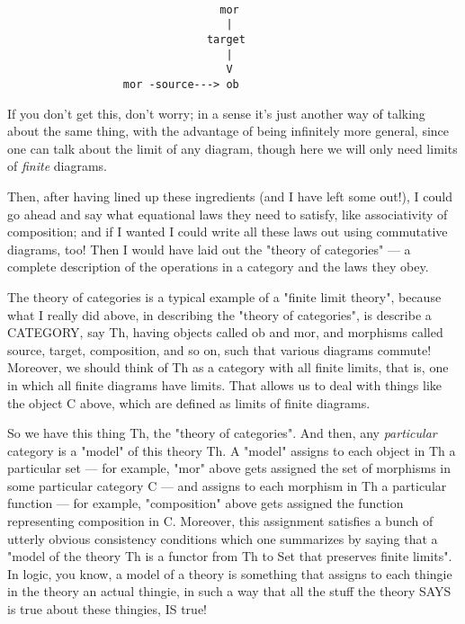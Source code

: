 \begin{verbatim}

                                 mor
                                  |
                               target
                                  |
                                  V
                  mor -source---> ob 
\end{verbatim}
    

If you don't get this, don't worry; in a sense it's just another way 
of talking about the same thing, with the advantage of being 
infinitely more general, since one can talk about the limit of 
any diagram, though here we will only need limits of \emph{finite}
diagrams.

Then, after having lined up these ingredients (and I have left some 
out!), I could go ahead and say what equational laws they need 
to satisfy, like associativity of composition; and if I wanted I 
could write all these laws out using commutative diagrams, too!  
Then I would have laid out the "theory of categories" --- 
a complete description of the operations in a category and the laws they obey.  

The theory of categories is a typical example of a "finite limit 
theory", because what I really did above, in describing
the "theory of categories", is describe a CATEGORY, say Th, having
objects called ob and mor, and morphisms called source, target, composition,
and so on, such that various diagrams commute!   Moreover, we should
think of Th as a category with all finite limits, that is, one in which
all finite diagrams have limits.  That allows us to deal with things
like the object C above, which are defined as limits of finite
diagrams.

So we have this thing Th, the "theory of categories".  And then, 
any \emph{particular} category is a "model" of this theory Th.
A "model" assigns to each object in Th a particular
set --- for example, "mor" above gets assigned
the set of morphisms in some particular category C --- and assigns to each
morphism in Th a particular function --- for example,  
"composition" above gets assigned the function representing composition
in C.  Moreover, this assignment satisfies a bunch of utterly obvious 
consistency conditions which one summarizes by saying that a 
"model of the theory Th is a functor from Th to Set that preserves 
finite limits".  In logic, you know, a model of a theory is something 
that assigns to each thingie in the theory an actual thingie, in such a 
way that all the stuff the theory SAYS is true about these thingies, 
IS true!

